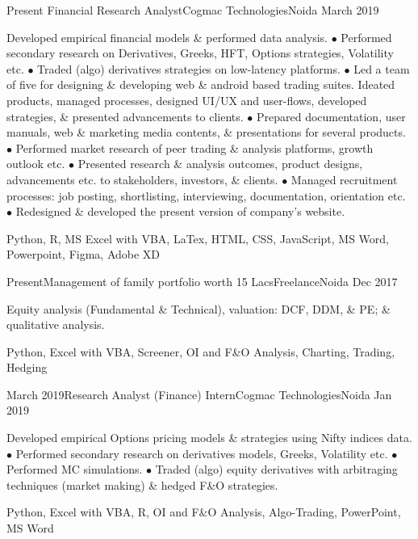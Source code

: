 %
%
%
\begin{experiences}
  \experience
    {Present}   {Financial Research Analyst}{Cogmac Technologies}{Noida}
    {March 2019}
    {
\begin{description}
Developed empirical financial models \& performed data analysis. $\bullet$ Performed secondary research on Derivatives, Greeks, HFT, Options strategies, Volatility etc. $\bullet$ Traded (algo) derivatives strategies on low-latency platforms. $\bullet$ Led a team of five for designing \& developing web \& android based trading suites. Ideated products, managed processes, designed UI/UX and user-flows, developed strategies, \& presented advancements to clients. $\bullet$ Prepared documentation, user manuals, web \& marketing media contents, \& presentations for several products. $\bullet$ Performed market research of peer trading \& analysis platforms, growth outlook etc. $\bullet$ Presented research \& analysis outcomes, product designs, advancements etc. to stakeholders, investors, \& clients. $\bullet$ Managed recruitment processes: job posting, shortlisting, interviewing, documentation, orientation etc. $\bullet$ Redesigned \& developed the present version of company's website.
\end{description}
}
        {Python, R, MS Excel with VBA, LaTex, HTML, CSS, JavaScript, MS Word, Powerpoint, Figma, Adobe XD}
\end{experiences}


\begin{experiences}
   \experience
    {Present}{Management of family portfolio worth 15 Lacs}{Freelance}{Noida}
    {Dec 2017}
    {
\begin{description}
        Equity analysis (Fundamental \& Technical), valuation: DCF, DDM, \& PE; \& qualitative analysis.
    \end{description}
    }
        {Python, Excel with VBA, Screener, OI and F\&O Analysis, Charting, Trading, Hedging}
\end{experiences}

\begin{experiences}
   \experience
    {March 2019}{Research Analyst (Finance) Intern}{Cogmac Technologies}{Noida}
    {Jan 2019}
    {
\begin{description}
    Developed empirical Options pricing models \& strategies using Nifty indices data. $\bullet$ Performed secondary research on derivatives models, Greeks, Volatility etc. $\bullet$ Performed MC simulations. $\bullet$ Traded (algo) equity derivatives with arbitraging techniques (market making) \& hedged F\&O strategies.
    \end{description}
    }
{Python, Excel with VBA, R, OI and F\&O Analysis, Algo-Trading, PowerPoint, MS Word}
\end{experiences}

